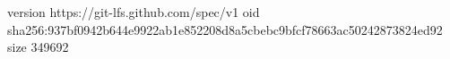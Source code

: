 version https://git-lfs.github.com/spec/v1
oid sha256:937bf0942b644e9922ab1e852208d8a5cbebc9bfcf78663ac50242873824ed92
size 349692
